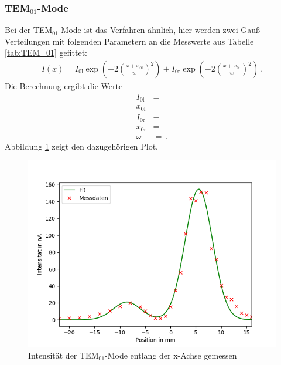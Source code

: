 \subsubsection{TEM$_{01}$-Mode}
Bei der TEM$_{01}$-Mode ist das Verfahren ähnlich, hier werden zwei Gauß-Verteilungen mit folgenden Parametern an die Messwerte aus Tabelle \ref{tab:TEM_01} gefittet:
\begin{align*}
	I(x) = I_\text{0l}\exp\left(-2\left(\frac{x+x_\text{0l}}{w}\right)^2\right) + I_\text{0r}\exp\left(-2\left(\frac{x+x_\text{0r}}{w}\right)^2\right) \ .
\end{align*}
Die Berechnung ergibt die Werte
\begin{align}
	I_\text{0l} &=  \\
	x_\text{0l} &=  \\
	I_\text{0r} &=   \\
	x_\text{0r} &=  \\
	\omega &=   \ .
\end{align}
Abbildung \ref{fig:TEM_01} zeigt den dazugehörigen Plot.
\begin{figure}[h!]
	\centering
	\includegraphics[width=.6\textwidth]{build/TEM_01.png}
	\caption{Intensität der TEM$_{01}$-Mode entlang der x-Achse gemessen}
	\label{fig:TEM_01}
\end{figure}

